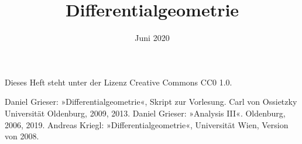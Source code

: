 \documentclass[a4paper,fleqn,11pt,dvipdfmx]{scrbook}
\title{Differentialgeometrie}
\date{Juni 2020}
\theoremstyle{rmbox}
\numberwithin{definition}{chapter}
\numberwithin{theorem}{chapter}
\begin{document}
\thispagestyle{empty}

\maketitle

Dieses Heft steht unter der Lizenz Creative Commons CC0 1.0.

\tableofcontents







\begin{thebibliography}{00}
 Daniel Grieser: »Differentialgeometrie«,
Skript zur Vorlesung. Carl von Ossietzky Universität Oldenburg, 2009, 2013.
 Daniel Grieser: »Analysis III«. Oldenburg, 2006, 2019.
 Andreas Kriegl: »Differentialgeometrie«, Universität Wien, Version von 2008.
\end{thebibliography}

\printindex
\end{document}
